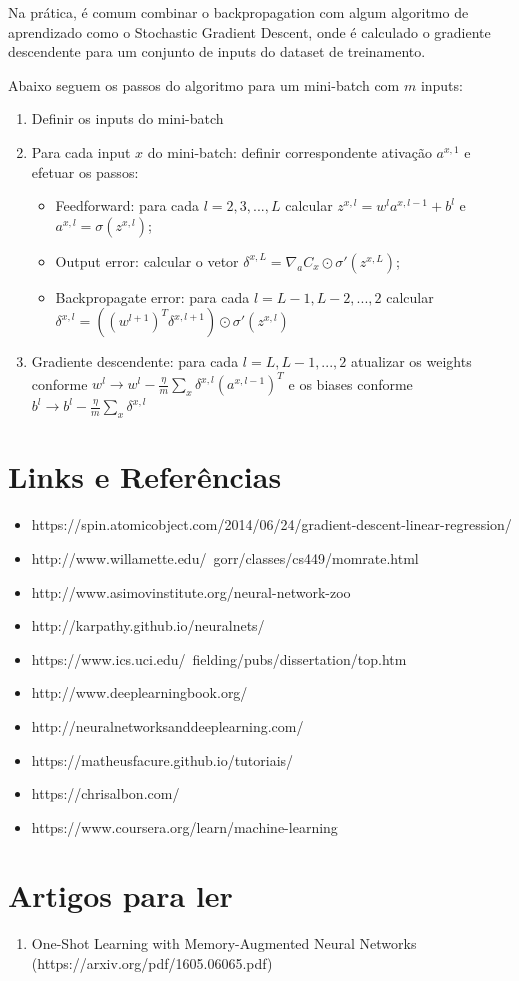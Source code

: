 \documentclass[11pt,a4paper,leqno]{article}
\begin{document}
Na prática, é comum combinar o backpropagation com algum algoritmo de aprendizado como o Stochastic Gradient Descent, onde é calculado o gradiente descendente para um conjunto de inputs do dataset de treinamento.

Abaixo seguem os passos do algoritmo para um mini-batch com $m$ inputs:
\begin{enumerate}
\item Definir os inputs do mini-batch
\item Para cada input $x$ do mini-batch: definir correspondente ativação $a^{x,1}$ e efetuar os passos:
\begin{itemize}
\item Feedforward: para cada $l = 2, 3, ..., L$ calcular $z^{x,l} = w^l a^{x,l-1} + b^l$ e $a^{x,l} = \sigma(z^{x,l})$;
\item Output error: calcular o vetor $\delta^{x,L} = \nabla_a C_x \odot \sigma'(z^{x,L})$;
\item Backpropagate error: para cada $l = L-1, L-2, ..., 2$ calcular $\delta^{x,l} = \left( (w^{l+1})^T \delta^{x,l+1} \right) \odot \sigma'(z^{x,l})$
\end{itemize}
\item Gradiente descendente: para cada $l = L,L-1,...,2$ atualizar os weights conforme $w^l \rightarrow w^l-\frac{\eta}{m} \sum_x \delta^{x,l} (a^{x,l-1})^T$ e os biases conforme $b^l \rightarrow b^l-\frac{\eta}{m} \sum_x \delta^{x,l}$
\end{enumerate}



\newpage
\section{Links e Referências}
\begin{itemize}
\item https://spin.atomicobject.com/2014/06/24/gradient-descent-linear-regression/
\item http://www.willamette.edu/~gorr/classes/cs449/momrate.html
\item http://www.asimovinstitute.org/neural-network-zoo
\item http://karpathy.github.io/neuralnets/
\item https://www.ics.uci.edu/~fielding/pubs/dissertation/top.htm
\item http://www.deeplearningbook.org/
\item http://neuralnetworksanddeeplearning.com/
\item https://matheusfacure.github.io/tutoriais/
\item https://chrisalbon.com/
\item https://www.coursera.org/learn/machine-learning
\end{itemize}





\section{Artigos para ler}
\begin{enumerate}
\item One-Shot Learning with Memory-Augmented Neural Networks \linebreak (https://arxiv.org/pdf/1605.06065.pdf)
\end{enumerate}
\end{document}
